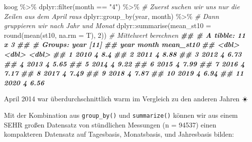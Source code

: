 \documentclass[
]{article}
\newenvironment{Shaded}{\begin{snugshade}}{\end{snugshade}}
\newcommand{\AttributeTok}[1]{\textcolor[rgb]{0.77,0.63,0.00}{#1}}
\newcommand{\CommentTok}[1]{\textcolor[rgb]{0.56,0.35,0.01}{\textit{#1}}}
\newcommand{\DecValTok}[1]{\textcolor[rgb]{0.00,0.00,0.81}{#1}}
\newcommand{\DocumentationTok}[1]{\textcolor[rgb]{0.56,0.35,0.01}{\textbf{\textit{#1}}}}
\newcommand{\FunctionTok}[1]{\textcolor[rgb]{0.00,0.00,0.00}{#1}}
\newcommand{\NormalTok}[1]{#1}
\newcommand{\SpecialCharTok}[1]{\textcolor[rgb]{0.00,0.00,0.00}{#1}}
\newcommand{\StringTok}[1]{\textcolor[rgb]{0.31,0.60,0.02}{#1}}
\begin{document}
\begin{Shaded}
\begin{Highlighting}[]
\NormalTok{koog }\SpecialCharTok{\%\textgreater{}\%}
\NormalTok{  dplyr}\SpecialCharTok{::}\FunctionTok{filter}\NormalTok{(month }\SpecialCharTok{==} \StringTok{"4"}\NormalTok{) }\SpecialCharTok{\%\textgreater{}\%} \CommentTok{\# Zuerst suchen wir uns nur die Zeilen aus dem April raus}
\NormalTok{  dplyr}\SpecialCharTok{::}\FunctionTok{group\_by}\NormalTok{(year, month) }\SpecialCharTok{\%\textgreater{}\%} \CommentTok{\# Dann gruppieren wir nach Jahr und Monat}
\NormalTok{  dplyr}\SpecialCharTok{::}\FunctionTok{summarise}\NormalTok{(}\AttributeTok{mean\_st10 =} \FunctionTok{round}\NormalTok{(}\FunctionTok{mean}\NormalTok{(st10, }\AttributeTok{na.rm =}\NormalTok{ T), }\DecValTok{2}\NormalTok{)) }\CommentTok{\# Mittelwert berechnen}
\DocumentationTok{\#\# \# A tibble: 11 x 3}
\DocumentationTok{\#\# \# Groups:   year [11]}
\DocumentationTok{\#\#     year month mean\_st10}
\DocumentationTok{\#\#    \textless{}dbl\textgreater{} \textless{}dbl\textgreater{}     \textless{}dbl\textgreater{}}
\DocumentationTok{\#\#  1  2010     4      8.4 }
\DocumentationTok{\#\#  2  2011     4      8.88}
\DocumentationTok{\#\#  3  2012     4      6.73}
\DocumentationTok{\#\#  4  2013     4      5.65}
\DocumentationTok{\#\#  5  2014     4      9.22}
\DocumentationTok{\#\#  6  2015     4      7.99}
\DocumentationTok{\#\#  7  2016     4      7.17}
\DocumentationTok{\#\#  8  2017     4      7.49}
\DocumentationTok{\#\#  9  2018     4      7.87}
\DocumentationTok{\#\# 10  2019     4      6.94}
\DocumentationTok{\#\# 11  2020     4      6.56}
\end{Highlighting}
\end{Shaded}

April 2014 war überdurchschnittlich warm im Vergleich zu den anderen Jahren ☀️

Mit der Kombination aus \texttt{group\_by()} und \texttt{summarize()} können wir aus einem SEHR großen Datensatz von stündlichen Messungen (n = 94537) einen kompakteren Datensatz auf Tagesbasis, Monatsbasis, und Jahresbasis bilden:
\end{document}
